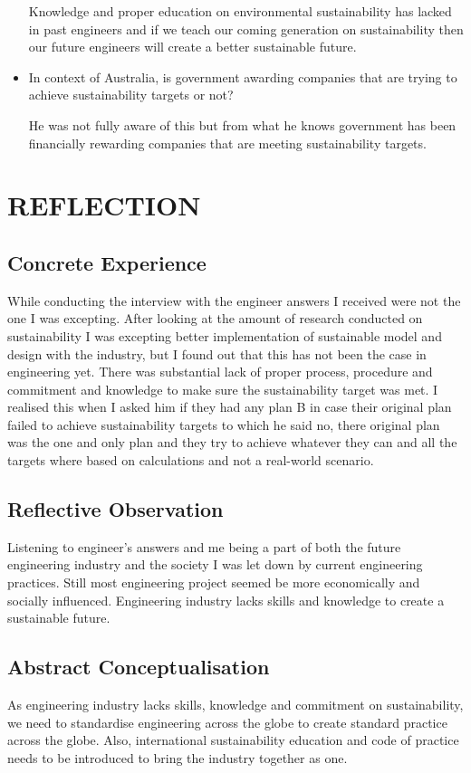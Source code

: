\documentclass{article}
\begin{document}
\begin{itemize}
Knowledge and proper education on environmental sustainability has lacked in past engineers and if we teach our coming generation on sustainability then our future engineers will create a better sustainable future. 
\item In context of Australia, is government awarding companies that are trying to achieve sustainability targets or not?


He was not fully aware of this but from what he knows government has been financially rewarding companies that are meeting sustainability targets. 
\end{itemize}

\section{REFLECTION}\label{reflection}

\subsection{Concrete Experience}\label{WHAT}
While conducting the interview with the engineer answers I received were not the one I was excepting. After looking at the amount of research conducted on sustainability I was excepting better implementation of sustainable model and design with the industry, but I found out that this has not been the case in engineering yet. There was substantial lack of proper process, procedure and commitment and knowledge to make sure the sustainability target was met. I realised this when I asked him if they had any plan B in case their original plan failed to achieve sustainability targets to which he said no, there original plan was the one and only plan and they try to achieve whatever they can and all the targets where based on calculations and not a real-world scenario.
\subsection{Reflective Observation}\label{WHY}
Listening to engineer's answers and me being a part of both the future engineering industry and the society I was let down by current engineering practices. Still most engineering project seemed be more economically and socially influenced. Engineering industry lacks skills and knowledge to create a sustainable future.
\subsection{Abstract Conceptualisation}\label{so what}
As engineering industry lacks skills, knowledge and commitment on sustainability, we need to standardise engineering across the globe to create standard practice across the globe. Also, international sustainability education and code of practice needs to be introduced to bring the industry together as one.
\end{document}

